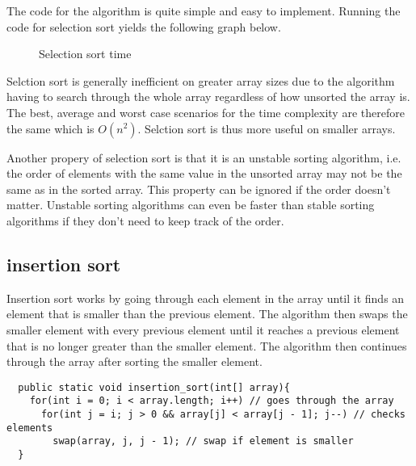 \documentclass[a4paper,11pt]{article}
\begin{document}
The code for the algorithm is quite simple and easy to implement. Running 
the code for selection sort yields the following graph below.

\begin{figure}[h]
  \centering
  \caption{Selection sort time}
  \label{fig:plot1}
\end{figure}

Selction sort is generally inefficient on greater array sizes due to the 
algorithm having to search through the whole array regardless of how 
unsorted the array is. The best, average and worst case scenarios for the 
time complexity are therefore the same which is $ O(n^2)$. Selction sort
is thus more useful on smaller arrays.

Another propery of selection sort is that it is an unstable sorting 
algorithm, i.e. the order of elements with the same value in the unsorted 
array may not be the same as in the sorted array. This property can be 
ignored if the order doesn't matter. Unstable sorting algorithms can even 
be faster than stable sorting algorithms if they don't need to keep track 
of the order.

\subsection*{insertion sort}

Insertion sort works by going through each element in the array until it 
finds an element that is smaller than the previous element. The algorithm 
then swaps the smaller element with every previous element until it 
reaches a previous element that is no longer greater than the smaller 
element. The algorithm then continues through the array after sorting the 
smaller element.

\begin{verbatim}
  public static void insertion_sort(int[] array){
    for(int i = 0; i < array.length; i++) // goes through the array
      for(int j = i; j > 0 && array[j] < array[j - 1]; j--) // checks elements
        swap(array, j, j - 1); // swap if element is smaller
  }
\end{verbatim}
\end{document}
